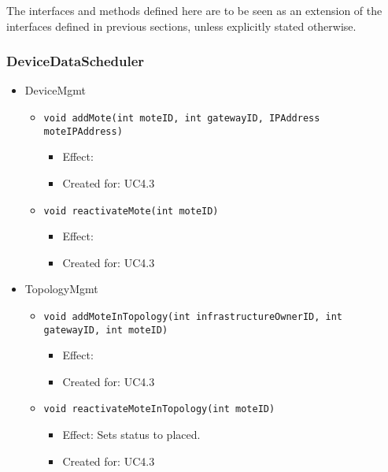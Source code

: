     The interfaces and methods defined here are to be seen as an
    extension of the interfaces defined in previous sections, unless
    explicitly stated otherwise.

    \subsubsection{DeviceDataScheduler}
        \begin{itemize}
            \item DeviceMgmt
            \begin{itemize}
                \item \texttt{void addMote(int moteID, int gatewayID, IPAddress moteIPAddress)}
                    \begin{itemize}
                        \item Effect:
                        \item Created for: UC4.3
                    \end{itemize}
                \item \texttt{void reactivateMote(int moteID)}
                    \begin{itemize}
                        \item Effect:
                        \item Created for: UC4.3
                    \end{itemize}
            \end{itemize}

        	\item TopologyMgmt
        	\begin{itemize}
        		\item \texttt{void addMoteInTopology(int infrastructureOwnerID, int gatewayID, int moteID)}
        		\begin{itemize}
        			\item Effect:
        			\item Created for: UC4.3
        		\end{itemize}

                \item \texttt{void reactivateMoteInTopology(int moteID)}
                \begin{itemize}
                    \item Effect: Sets status to placed.
                    \item Created for: UC4.3
                \end{itemize}
        	\end{itemize}
        \end{itemize}

